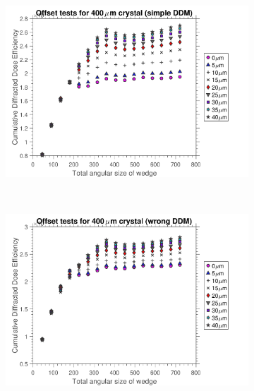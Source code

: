 \begin{figure}
	\centering
    \begin{subfigure}[b]{1\textwidth}
        \centering
        \includegraphics[width=\textwidth]{figures/dwd/OffsetSimulationDDMsimpleCrystSize400.pdf}
        \caption{}
        \label{fig:Offset simulations 400 - Simple Eta}
    \end{subfigure}
    \\
	\begin{subfigure}[b]{1\textwidth}
        \centering
        \includegraphics[width=\textwidth]{figures/dwd/OffsetSimulationDDMwrongCrystSize400.pdf}
        \caption{}
        \label{fig:Offset simulations 400 - Decreasing Eta}
    \end{subfigure}
\end{figure}
